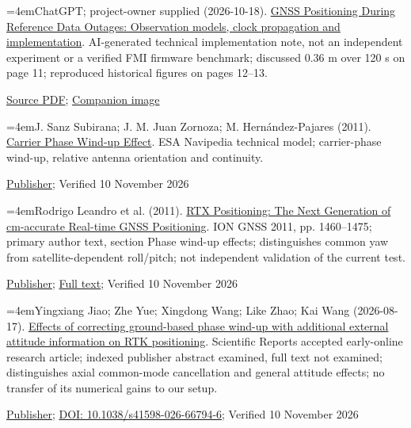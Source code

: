 \documentclass[11pt,a4paper]{article}
\numberwithin{equation}{section}
\numberwithin{figure}{section}
\begin{document}
\begin{samepage}\noindent\hangindent=4emChatGPT; project-owner supplied (2026-10-18). \href{../../../references/literature/2026-10-18.gnss-reference-outage.pdf}{GNSS Positioning During Reference Data Outages: Observation models, clock propagation and implementation}. AI-generated technical implementation note, not an independent experiment or a verified FMI firmware benchmark; discussed 0.36 m over 120 s on page 11; reproduced historical figures on pages 12–13.
{\small \href{../../../references/literature/2026-10-18.gnss-reference-outage.pdf}{Source PDF}; \href{../../../references/literature/2026-10-18.gnss-reference-outage.Image_20261018004027_50_24.jpg}{Companion image}\par}
\end{samepage}\medskip
\begin{samepage}\noindent\hangindent=4emJ. Sanz Subirana; J. M. Juan Zornoza; M. Hernández-Pajares (2011). \href{https://gssc.esa.int/navipedia/index.php/Carrier_Phase_Wind-up_Effect}{Carrier Phase Wind-up Effect}. ESA Navipedia technical model; carrier-phase wind-up, relative antenna orientation and continuity.
{\small \href{https://gssc.esa.int/navipedia/index.php/Carrier_Phase_Wind-up_Effect}{Publisher}; Verified 10 November 2026\par}
\end{samepage}\medskip
\begin{samepage}\noindent\hangindent=4emRodrigo Leandro et al. (2011). \href{https://www.ion.org/publications/abstract.cfm?articleID=9705}{RTX Positioning: The Next Generation of cm-accurate Real-time GNSS Positioning}. ION GNSS 2011, pp. 1460–1475; primary author text, section Phase wind-up effects; distinguishes common yaw from satellite-dependent roll/\allowbreak{}pitch; not independent validation of the current test.
{\small \href{https://www.ion.org/publications/abstract.cfm?articleID=9705}{Publisher}; \href{https://domain-seeger.de/wp-content/uploads/publications/paper/TrimbleRTXNextGenerationGNSSPositioning.pdf}{Full text}; Verified 10 November 2026\par}
\end{samepage}\medskip
\begin{samepage}\noindent\hangindent=4emYingxiang Jiao; Zhe Yue; Xingdong Wang; Like Zhao; Kai Wang (2026-08-17). \href{https://doi.org/10.1038/s41598-026-66794-6}{Effects of correcting ground-based phase wind-up with additional external attitude information on RTK positioning}. Scientific Reports accepted early-online research article; indexed publisher abstract examined, full text not examined; distinguishes axial common-mode cancellation and general attitude effects; no transfer of its numerical gains to our setup.
{\small \href{https://doi.org/10.1038/s41598-026-66794-6}{Publisher}; \href{https://doi.org/10.1038/s41598-026-66794-6}{DOI: 10.1038/\allowbreak{}s41598-026-66794-6}; Verified 10 November 2026\par}
\end{samepage}\medskip
\end{document}

